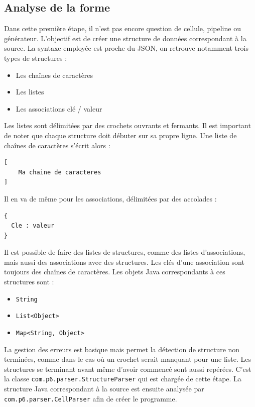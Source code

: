 \documentclass[a4paper, 12pt]{article}
\newcommand{\inline}[1]{\texttt{#1}}
\begin{document}
\subsection{Analyse de la forme}
Dans cette première étape, il n’est pas encore question de cellule, pipeline ou générateur. L’objectif est de créer une structure de données correspondant à la source. La syntaxe employée est proche du JSON, on retrouve notamment trois types de structures :
\begin{itemize}
  \item Les chaînes de caractères
  \item Les listes
  \item Les associations clé / valeur
\end{itemize}
Les listes sont délimitées par des crochets ouvrants et fermants. Il est important de noter que chaque structure doit débuter sur sa propre ligne. Une liste de chaînes de caractères s’écrit alors :
\begin{lstlisting}
[
	Ma chaine de caracteres
]
\end{lstlisting}
Il en va de même pour les associations, délimitées par des accolades :
\begin{lstlisting}
{
  Cle : valeur
}
\end{lstlisting}
Il est possible de faire des listes de structures, comme des listes d’associations, mais aussi des associations avec des structures. Les clés d’une association sont toujours des chaînes de caractères. Les objets Java correspondants à ces structures sont :
\begin{itemize}
  \item \inline{String}
  \item \inline{List<Object>}
  \item \inline{Map<String, Object>}
\end{itemize}
La gestion des erreurs est basique mais permet la détection de structure non terminées, comme dans le cas où un crochet serait manquant pour une liste. Les structures se terminant avant même d’avoir commencé sont aussi repérées.
C’est la classe \inline{com.p6.parser.StructureParser} qui est chargée de cette étape. La structure Java correspondant à la source est ensuite analysée par \inline{com.p6.parser.CellParser} afin de créer le programme.

\pagebreak
\end{document}
